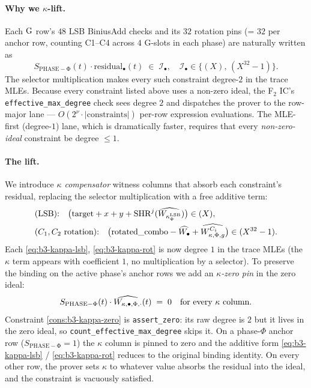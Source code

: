\paragraph{Why we $\kappa$-lift.}
Each $\operatorname{G}$ row's $48$ LSB BiniusAdd checks and its $32$ rotation
pins (= $32$ per anchor row, counting C1–C4 across $4$ G-slots in
each phase) are naturally written as
\[
S_{\mathrm{PHASE-\Phi}}(t) \cdot \mathrm{residual}_{\bullet}(t)
\;\in\;
\mathcal{I}_{\bullet},
\quad \mathcal{I}_{\bullet} \in \{(X),\, (X^{32}-1)\}.
\]
The selector multiplication makes every such constraint degree-$2$
in the trace MLEs. Because every constraint listed above uses a
non-zero ideal, the F$_2$ IC's \texttt{effective\_max\_degree} check
sees degree $2$ and dispatches the prover to the row-major lane —
$O(2^{\nu} \cdot |\text{constraints}|)$ per-row expression
evaluations. The MLE-first (degree-$1$) lane, which is dramatically
faster, requires that every \emph{non-zero-ideal} constraint be
degree $\le 1$.

\paragraph{The lift.}
We introduce \emph{$\kappa$ compensator} witness columns that absorb
each constraint's residual, replacing the selector multiplication
with a free additive term:
\begin{align}
&\text{(LSB):}\quad
\bigl(\mathrm{target} + x + y +
\operatorname{SHR}^{j}(\widehat{W_{\kappa^{\mathrm{LSB}}_\Phi}})\bigr)
\in (X), \label{eq:b3-kappa-lsb}\\
&\text{($C_1, C_2$ rotation):}\quad
\bigl(\mathrm{rotated\_combo} - \widehat{W_{\bullet}}
+ \widehat{W^{C_i}_{\kappa,\Phi,g}}\bigr)
\in (X^{32}-1). \label{eq:b3-kappa-rot}
\end{align}
Each \eqref{eq:b3-kappa-lsb}, \eqref{eq:b3-kappa-rot} is now degree
$1$ in the trace MLEs (the $\kappa$ term appears with coefficient
$1$, no multiplication by a selector). To preserve the binding on
the active phase's anchor rows we add an \emph{$\kappa$-zero pin}
in the zero ideal:
\begin{equation}\label{cons:b3-kappa-zero}
S_{\mathrm{PHASE-\Phi}}(t) \cdot \widehat{W_{\kappa,\bullet,\Phi,\cdot}}(t)
\;=\; 0
\quad\text{for every $\kappa$ column.}
\end{equation}
Constraint \eqref{cons:b3-kappa-zero} is \texttt{assert\_zero}: its
raw degree is $2$ but it lives in the zero ideal, so
\texttt{count\_effective\_max\_degree} skips it. On a phase-$\Phi$
anchor row ($S_{\mathrm{PHASE-\Phi}} = 1$) the $\kappa$ column is
pinned to zero and the additive form \eqref{eq:b3-kappa-lsb} /
\eqref{eq:b3-kappa-rot} reduces to the original binding identity.
On every other row, the prover sets $\kappa$ to whatever value
absorbs the residual into the ideal, and the constraint is
vacuously satisfied.

